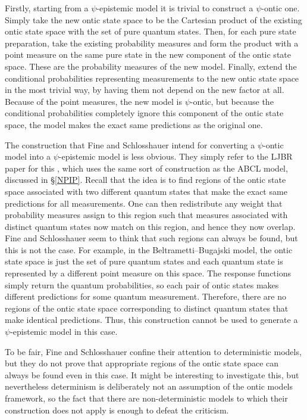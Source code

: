 \documentclass[DIV=calc,paper=a4,fontsize=11pt,twocolumn]{scrartcl} %
\theoremstyle{definition}
\theoremstyle{plain}
\begin{document}
Firstly, starting from a $\psi$-epistemic model it is trivial to
construct a $\psi$-ontic one.  Simply take the new ontic state space
to be the Cartesian product of the existing ontic state space with the
set of pure quantum states.  Then, for each pure state preparation,
take the existing probability measures and form the product with a
point measure on the same pure state in the new component of the ontic
state space.  These are the probability measures of the new model.
Finally, extend the conditional probabilities representing
measurements to the new ontic state space in the most trivial way, by
having them not depend on the new factor at all.  Because of the point
measures, the new model is $\psi$-ontic, but because the conditional
probabilities completely ignore this component of the ontic state
space, the model makes the exact same predictions as the original one.

The construction that Fine and Schlosshauer intend for converting a
$\psi$-ontic model into a $\psi$-epistemic model is less obvious.
They simply refer to the LJBR paper for this \cite{Lewis2012}, which
uses the same sort of construction as the ABCL model, discussed in
\S\ref{NPIP}.  Recall that the idea is to find regions of the ontic
state space associated with two different quantum states that make the
exact same predictions for all measurements.  One can then
redistribute any weight that probability measures assign to this
region such that measures associated with distinct quantum states now
match on this region, and hence they now overlap.  Fine and
Schlosshauer seem to think that such regions can always be found, but
this is not the case.  For example, in the Beltrametti--Bugajski model,
the ontic state space is just the set of pure quantum states and each
quantum state is represented by a different point measure on this
space.  The response functions simply return the quantum
probabilities, so each pair of ontic states makes different
predictions for some quantum measurement.  Therefore, there are no
regions of the ontic state space corresponding to distinct quantum
states that make identical predictions.  Thus, this construction
cannot be used to generate a $\psi$-epistemic model in this case.

To be fair, Fine and Schlosshauer confine their attention to
deterministic models, but they do not prove that appropriate regions
of the ontic state space can always be found even in this case.  It
might be interesting to investigate this, but nevertheless determinism
is deliberately not an assumption of the ontic models framework, so
the fact that there are non-deterministic models to which their
construction does not apply is enough to defeat the criticism.
\end{document}

